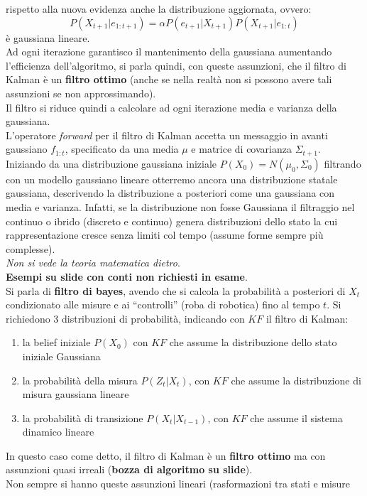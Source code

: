 \documentclass[a4paper,12pt, oneside]{book}
\begin{document}
rispetto alla nuova evidenza anche la distribuzione aggiornata, ovvero:
\[P(X_{t+1}|e_{1:t+1})=\alpha P(e_{t+1}|X_{t+1})P(X_{t+1}|e_{1:t})\]
è gaussiana lineare.\\
Ad ogni iterazione garantisco il mantenimento della gaussiana aumentando
l'efficienza dell'algoritmo, si parla quindi, con queste assunzioni, che il
filtro di Kalman è un \textbf{filtro ottimo} (anche se nella realtà non si
possono avere tali assunzioni se non approssimando).\\
Il filtro si riduce quindi a calcolare ad ogni iterazione media e varianza
della gaussiana.\\
L'operatore \textit{forward} per il filtro di Kalman accetta un messaggio in
avanti gaussiano $f_{1:t}$, specificato da una media $\mu$ e matrice di
covarianza $\Sigma_{t+1}$. Iniziando da una distribuzione gaussiana iniziale
$P(X_0)=N(\mu_0,\Sigma_0)$ filtrando con un modello gaussiano lineare otterremo
ancora una distribuzione statale gaussiana, descrivendo la distribuzione a
posteriori come una gaussiana con media e varianza. Infatti, se la distribuzione
non fosse Gaussiana il filtraggio nel continuo o ibrido (discreto e continuo)
genera distribuzioni dello stato la cui rappresentazione cresce senza limiti col
tempo (assume forme sempre più complesse). \\
\textit{Non si vede la teoria matematica dietro}.\\
\textbf{Esempi su slide con conti non richiesti in esame}.\\
Si parla di \textbf{filtro di bayes}, avendo che si calcola la probabilità a
posteriori di $X_t$ condizionato alle 
misure e ai ``controlli'' (roba di robotica) fino al tempo $t$. Si richiedono 3
distribuzioni di probabilità, indicando con $KF$ il filtro di Kalman:
\begin{enumerate}
  \item la belief iniziale $P(X_0)$ con $KF$ che assume la distribuzione dello
  stato iniziale Gaussiana 
  \item la probabilità della misura $P(Z_t|X_t)$, con $KF$ che assume la
  distribuzione di misura gaussiana lineare 
  \item la probabilità di transizione $P(X_t|X_{t-1})$, con $KF$ che assume il
  sistema dinamico lineare 
\end{enumerate}
In questo caso come detto, il filtro di Kalman è un \textbf{filtro ottimo} ma
con assunzioni quasi irreali (\textbf{bozza di algoritmo su slide}).\\
Non sempre si hanno queste assunzioni lineari (rasformazioni tra stati e misure
\end{document}
